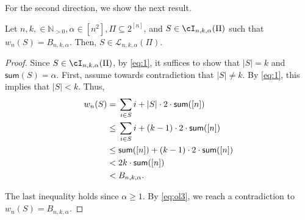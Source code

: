 For the second direction, we show the next result.
\begin{lemma}
	\label{lemma:onlyif}
	Let $n,k, \in \mathbb{N}_{>0}, \alpha \in \left[ n^2\right], \Pi \subseteq 2^{[n]}$, and $S \in \cI_{n,k,\alpha}(\Pi)$ such that $w_{n}(S) = B_{n,k,\alpha}$. Then, $S \in \mathcal{L}_{n,k,\alpha}(\Pi)$. 
\end{lemma}
\begin{proof}
	Since $S \in \cI_{n,k,\alpha}(\Pi)$, by \eqref{eq:1}, it suffices to show that $|S| = k$ and $\textsf{sum}(S) = \alpha$. First, assume towards contradiction that $|S| \neq k$. By \eqref{eq:1}, this implies that  $|S|< k$. Thus,
\begin{equation}
			\label{eq:ol3}
			\begin{aligned}
				w_{n}(S) ={} & \sum_{i \in S} i+|S| \cdot 2 \cdot \textnormal{\textsf{sum}}([n]) \\
				\leq{} & \sum_{i \in S} i+(k-1) \cdot 2 \cdot \textnormal{\textsf{sum}}([n]) \\
				\leq{} &  \textnormal{\textsf{sum}}([n])+(k-1) \cdot 2 \cdot \textnormal{\textsf{sum}}([n]) \\
				<{} & 2 k\cdot \textnormal{\textsf{sum}}([n]) \\
				<{} & B_{n,k,\alpha}.
			\end{aligned}
		\end{equation} 
		
The last inequality holds since $\alpha \geq 1$. By \eqref{eq:ol3}, we reach a contradiction to $w_{n}(S) = B_{n,k,\alpha}$.		
		
		

\end{proof}
